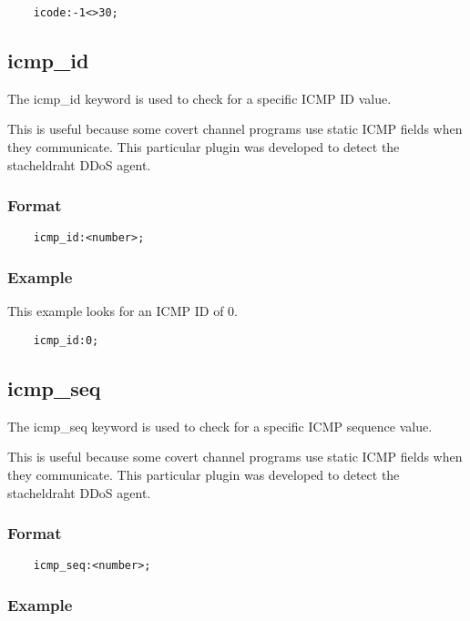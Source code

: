 \documentclass[english]{report}
\begin{document}
\begin{verbatim}
    icode:-1<>30;
\end{verbatim}

\subsection{icmp\_id}

The icmp\_id keyword is used to check for a specific ICMP ID value.

This is useful because some covert channel programs use static ICMP fields when
they communicate.  This particular plugin was developed to detect the
stacheldraht DDoS agent.

\subsubsection{Format}

\begin{verbatim}
    icmp_id:<number>;
\end{verbatim}

\subsubsection{Example}

This example looks for an ICMP ID of 0.

\begin{verbatim}
    icmp_id:0;
\end{verbatim}

\subsection{icmp\_seq}

The icmp\_seq keyword is used to check for a specific ICMP sequence value.

This is useful because some covert channel programs use static ICMP fields when
they communicate.  This particular plugin was developed to detect the
stacheldraht DDoS agent.

\subsubsection{Format}

\begin{verbatim}
    icmp_seq:<number>;
\end{verbatim}

\subsubsection{Example}
\end{document}
